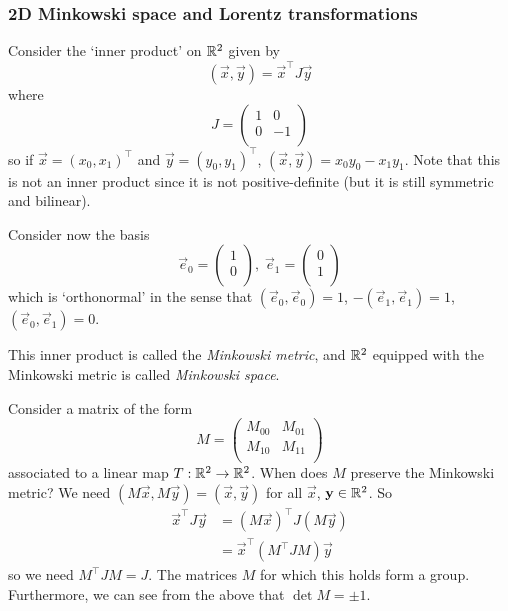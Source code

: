 \documentclass{../template/note}
\begin{document}
    \subsubsection{2D Minkowski space and Lorentz transformations}

    Consider the `inner product' on \(\mathbb R^2\) given by
    \[
        (\vec x, \vec y) = \vec x^\intercal J \vec y
    \]
    where
    \[
        J = \begin{pmatrix}
         1 & 0 \\
         0 & -1 \\
        \end{pmatrix}
    \]
    so if \(\vec x = (x_0, x_1)^\intercal\) and \(\vec y = (y_0, y_1)^\intercal\), \((\vec x, \vec y) = x_0y_0 - x_1y_1\). Note that this is not an inner product since it is not positive-definite (but it is still symmetric and bilinear).

    Consider now the basis
    \[
        \vec e_0 = \begin{pmatrix}
         1 \\
         0 \\
        \end{pmatrix}, \; \vec e_1 = \begin{pmatrix}
         0 \\
         1 \\
        \end{pmatrix}
    \]
    which is `orthonormal' in the sense that \((\vec e_0, \vec e_0) = 1\), \(-(\vec e_1, \vec e_1) = 1\), \((\vec e_0, \vec e_1) = 0\).

    \begin{definition}
        This inner product is called the \emph{Minkowski metric}, and \(\mathbb R^2\) equipped with the Minkowski metric is called \emph{Minkowski space}.
    \end{definition}
    Consider a matrix of the form
    \[
        M = \begin{pmatrix}
         M_{00} & M_{01} \\
         M_{10} & M_{11} \\
        \end{pmatrix}
    \]
    associated to a linear map \(T: \mathbb R^2 \to \mathbb R^2\). When does \(M\) preserve the Minkowski metric? We need \((M \vec x, M \vec y) = (\vec x, \vec y)\) for all \(\vec x\), \(\vec y \in \RR^2\). So
    \begin{align*}
        \vec x^\intercal J \vec y &= (M \vec x)^\intercal J (M \vec y) \\
        &= \vec x^\intercal (M^\intercal J M)\vec y 
    \end{align*}
    so we need \(M^\intercal J M = J\). The matrices \(M\) for which this holds form a group. Furthermore, we can see from the above that \(\det M = \pm 1\).
    
\end{document}

